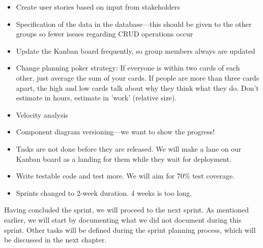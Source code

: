 \begin{itemize}
    \item Create user stories based on input from stakeholders
    \item Specification of the data in the database---this should be given to the other groups so fewer issues regarding CRUD operations occur
    \item Update the Kanban board frequently, so group members always are updated
    \item Change planning poker strategy:
    \subitem If everyone is within two cards of each other, just average the sum of your cards.
    \subitem If people are more than three cards apart, the high and low cards talk about why they think what they do.
    \subitem Don't estimate in hours, estimate in 'work' (relative size).
    \item Velocity analysis
    \item Component diagram versioning---we want to show the progress!
    \item Tasks are not done before they are released. We will make a lane on our Kanban board as a landing for them while they wait for deployment.
    \item Write testable code and test more. We will aim for 70\% test coverage.
    \item Sprints changed to 2-week duration. 4 weeks is too long.
\end{itemize}

Having concluded the sprint, we will proceed to the next sprint. As mentioned earlier, we will start by documenting what we did not document during this sprint. Other tasks will be defined during the sprint planning process, which will be discussed in the next chapter.